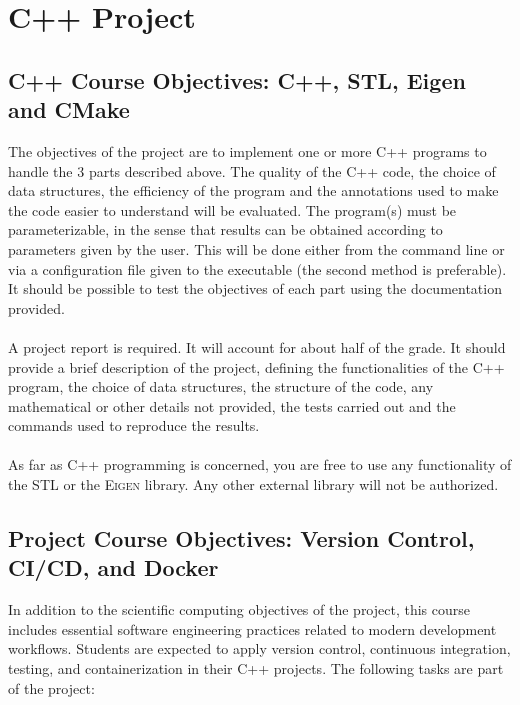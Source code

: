 \documentclass[english,10pt,a4paper]{article}
\begin{document}

\section{C++ Project}

\subsection{C++ Course Objectives: C++, STL, Eigen and CMake}

The objectives of the project are to implement one or more C++ programs to handle the 3 parts described above.
The quality of the C++ code, the choice of data structures, the efficiency of the program and the annotations used to make the code easier to understand will be evaluated.
The program(s) must be parameterizable, in the sense that results can be obtained according to parameters given by the user.
This will be done either from the command line or via a configuration file given to the executable (the second method is preferable).
It should be possible to test the objectives of each part using the documentation provided.

\paragraph{}
A project report is required. It will account for about half of the grade. It should provide a brief description of the project, defining the functionalities of the C++ program,
the choice of data structures, the structure of the code, any mathematical or other details not provided, the tests carried out and the commands used to reproduce the results.

\paragraph{}
As far as C++ programming is concerned, you are free to use any functionality of the STL or the \textsc{Eigen} library. Any other external library will not be authorized.


\subsection{Project Course Objectives: Version Control, CI/CD, and Docker}

In addition to the scientific computing objectives of the project, this course includes essential software engineering practices related to modern development workflows. Students are expected to apply version control, continuous integration, testing, and containerization in their C++ projects. The following tasks are part of the project:
\end{document}
